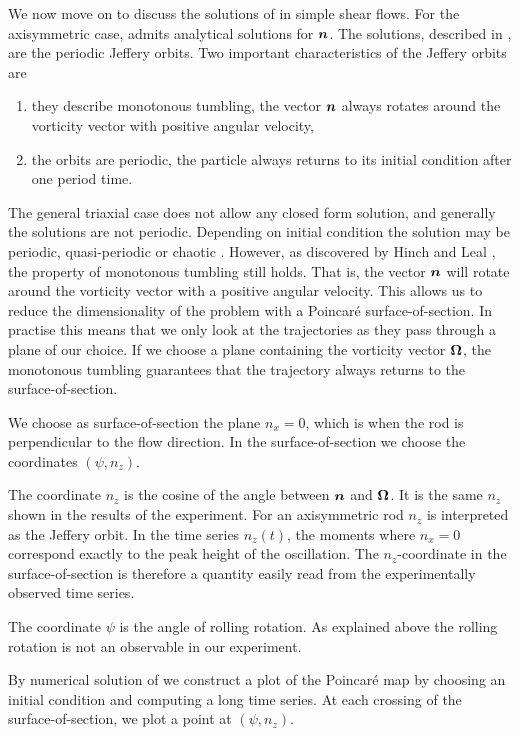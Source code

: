 \documentclass[thesis.tex]{subfiles}
\begin{document}
We now move on to discuss the solutions of  in simple shear flows. For the axisymmetric case,  admits analytical solutions for $\mbox{\boldmath$n$}$. The solutions, described in , are the periodic Jeffery orbits. Two important characteristics of the Jeffery orbits are
\begin{enumerate}
	\item they describe monotonous tumbling, the vector $\mbox{\boldmath$n$}$ always rotates around the vorticity vector with positive angular velocity,
	\item the orbits are periodic, the particle always returns to its initial condition after one period time.
\end{enumerate}
The general triaxial case does not allow any closed form solution, and generally the solutions are not periodic. Depending on initial condition the solution may be periodic, quasi-periodic or chaotic \cite{hinch1979,yarin1997}. However, as discovered by Hinch and Leal \cite{hinch1979}, the property of monotonous tumbling still holds. That is, the vector $\mbox{\boldmath$n$}$ will rotate around the vorticity vector with a positive angular velocity. This allows us to reduce the dimensionality of the problem with a Poincar\'e surface-of-section. In practise this means that we only look at the trajectories as they pass through a plane of our choice. If we choose a plane containing the vorticity vector $\mbox{\boldmath$\Omega$}$, the monotonous tumbling guarantees that the trajectory always returns to the surface-of-section.

We choose as surface-of-section the plane $n_x=0$, which is when the rod is perpendicular to the flow direction. In the surface-of-section we choose the coordinates $(\psi, n_z)$. 

The coordinate $n_z$ is the cosine of the angle between $\mbox{\boldmath$n$}$ and $\mbox{\boldmath$\Omega$}$. It is the same $n_z$ shown in the results of the experiment. For an axisymmetric rod $n_z$ is interpreted as the Jeffery orbit. In the time series $n_z(t)$, the moments where $n_x=0$ correspond exactly to the peak height of the oscillation. The $n_z$-coordinate in the surface-of-section is therefore a quantity easily read from the experimentally observed time series. 

The coordinate $\psi$ is the angle of rolling rotation. As explained above the rolling rotation is not an observable in our experiment. 

By numerical solution of  we construct a plot of the Poincar\'e map by choosing an initial condition and computing a long time series. At each crossing of the surface-of-section, we plot a point at $(\psi, n_z)$.
\end{document}
